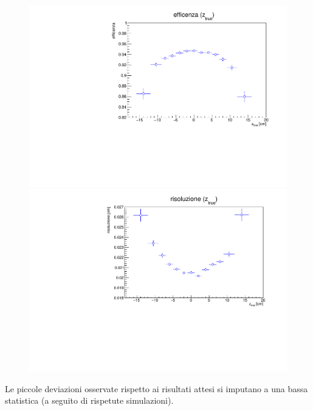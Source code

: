 \documentclass{article}
\begin{document}
\begin{figure}[H]
	\includegraphics[scale=0.4]{effztruefunc}
	
	\endminipage\hfill
	\includegraphics[scale=0.42]{risztruefunc}
	
	\endminipage


\end{figure}
\noindent
Le piccole deviazioni osservate rispetto ai risultati attesi si imputano a una bassa statistica (a seguito di rispetute simulazioni).
\end{document}
